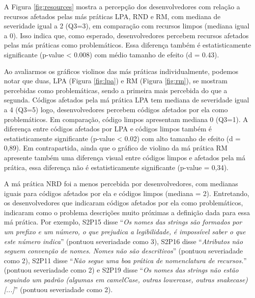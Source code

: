 A Figura \ref{fig:resources} mostra a percepção dos desenvolvedores com relação a recursos afetados pelas más práticas \textsc{LPA}, RND e \textsc{RM}, com mediana de severidade igual a 2 (Q3=3), em comparação com recursos limpos (mediana igual a 0). Isso indica que, como esperado, desenvolvedores percebem recursos afetados pelas más práticas como problemáticos. Essa diferença também é estatisticamente significante (p-value < 0.008) com médio tamanho de efeito (d = 0.43).


Ao avaliarmos os gráficos violinos das más práticas individualmente, podemos notar que duas, \textsc{LPA} (Figura \ref{fig:lpa}) e \textsc{RM} (Figura \ref{fig:rm}), se mostram percebidas como problemáticas, sendo a primeira mais percebida do que a segunda. Códigos afetados pela má prática \textsc{LPA} tem mediana de severidade igual a 4 (Q3=5) logo, desenvolvedores percebem códigos afetados por ela como problemáticos. Em comparação, código limpos apresentam mediana 0 (Q3=1). A diferença entre códigos afetados por \textsc{LPA} e códigos limpos também é estatisticamente significante (p-value < 0.02) com alto tamanho de efeito (d = 0,89). Em contrapartida, ainda que o gráfico de violino da má prática \textsc{RM} apresente também uma diferença visual entre códigos limpos e afetados pela má prática, essa diferença não é estatisticamente significante (p-value = 0,34).

A má prática \textsc{NRD} foi a menos percebida por desenvolvedores, com medianas iguais para códigos afetados por ela e códigos limpos (mediana = 2). Entretando, os desenvolvedores que indicaram códigos afetados por ela como problemáticos, indicaram como o problema descrições muito próximas a definição dada para essa má prática. Por exemplo, S2P15 disse ``\textit{Os nomes das strings são formados por um prefixo e um número, o que prejudica a legibilidade, é impossível saber o que este número indica}'' (pontuou severiadade como 3), S2P16 disse ``\textit{Atributos não seguem convenção de nomes. Nomes não são descritivos}'' (pontuou severiadade como 2), S2P11 disse ``\textit{Não segue uma boa prática de nomenclatura de recursos.}'' (pontuou severiadade como 2) e S2P19 disse ``\textit{Os nomes das strings não estão seguindo um padrão (algumas em camelCase, outras lowercase, outras snakecase) [...]}'' (pontuou severiadade como 2). 



